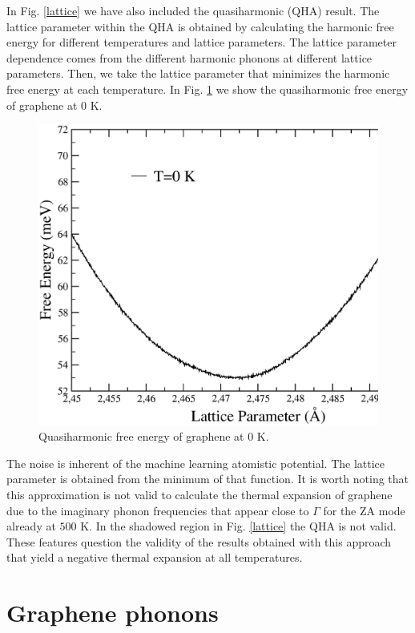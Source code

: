 In Fig. \ref{lattice} we have also included the quasiharmonic (QHA) result. The lattice parameter within 
the QHA is obtained by calculating the harmonic free energy for different temperatures and lattice parameters. The 
lattice parameter dependence comes from the different harmonic phonons at different lattice parameters. Then, we take 
the lattice parameter that minimizes the harmonic free energy at each temperature. In Fig. \ref{qhT0} we show the 
quasiharmonic free energy of graphene at 0 K.
\begin{figure}[ht]
\includegraphics[width=0.99\linewidth]{Figures/QHT0.eps}
\caption[Quasiharmonic free energy of graphene.]{Quasiharmonic free energy of graphene at 0 K.}
\label{qhT0}
\end{figure}
The noise is inherent of the machine learning atomistic potential. The lattice parameter is obtained from the minimum 
of that function. It is worth noting that this 
approximation is not valid to calculate the thermal expansion of graphene due to the imaginary phonon frequencies 
that appear close to $\Gamma$ for the ZA mode already at $500$ K. In the shadowed region in Fig. \ref{lattice} the 
QHA is not valid. These features question the validity of the results obtained with this approach that yield a 
negative thermal expansion at all temperatures\cite{mounet2005first}.

\section{Graphene phonons}

